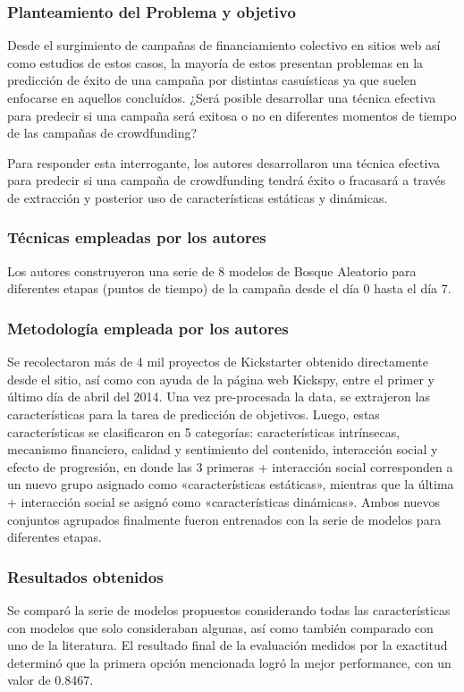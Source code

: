 \subsubsection{Planteamiento del Problema y objetivo}
Desde el surgimiento de campañas de financiamiento colectivo en sitios web así como estudios de estos casos, la mayoría de estos presentan problemas en la predicción de éxito de una campaña por distintas casuísticas ya que suelen enfocarse en aquellos concluídos. ¿Será posible desarrollar una técnica efectiva para predecir si una campaña será exitosa o no en diferentes momentos de tiempo de las campañas de crowdfunding?

Para responder esta interrogante, los autores desarrollaron una técnica efectiva para predecir si una campaña de crowdfunding tendrá éxito o fracasará a través de extracción y posterior uso de características estáticas y dinámicas.

\subsubsection{Técnicas empleadas por los autores}
Los autores construyeron una serie de 8 modelos de Bosque Aleatorio para diferentes etapas (puntos de tiempo) de la campaña desde el día 0 hasta el día 7.

\subsubsection{Metodología empleada por los autores}
Se recolectaron más de 4 mil proyectos de Kickstarter obtenido directamente desde el sitio, así como con ayuda de la página web Kickspy, entre el primer y último día de abril del 2014. Una vez pre-procesada la data, se extrajeron las características para la tarea de predicción de objetivos. Luego, estas características se clasificaron en 5 categorías: características intrínsecas, mecanismo financiero, calidad y sentimiento del contenido, interacción social y efecto de progresión, en donde las 3 primeras + interacción social corresponden a un nuevo grupo asignado como «características estáticas», mientras que la última + interacción social se asignó como «características dinámicas». Ambos nuevos conjuntos agrupados finalmente fueron entrenados con la serie de modelos para diferentes etapas.

\subsubsection{Resultados obtenidos}
Se comparó la serie de modelos propuestos considerando todas las características con modelos que solo consideraban algunas, así como también comparado con uno de la literatura. El resultado final de la evaluación medidos por la exactitud determinó que la primera opción mencionada logró la mejor performance, con un valor de 0.8467.


